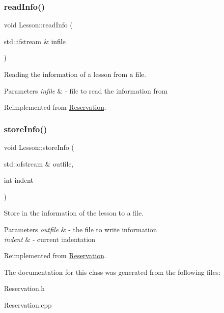 \mbox{\label{class_lesson_a3ac64e2f79bc9e381634d5d30499e8f1}} 
\subsubsection{\texorpdfstring{read\+Info()}{readInfo()}}
{\footnotesize\ttfamily void Lesson\+::read\+Info (\begin{DoxyParamCaption}\item[{std\+::ifstream \&}]{infile }\end{DoxyParamCaption})\hspace{0.3cm}{\ttfamily [virtual]}}



Reading the information of a lesson from a file. 


\begin{DoxyParams}{Parameters}
{\em infile} & -\/ file to read the information from \\
\hline
\end{DoxyParams}


Reimplemented from \mbox{\hyperlink{class_reservation_acff32024a350c2156af9f74522c59b7b}{Reservation}}.

\mbox{\label{class_lesson_a645855060ab3c915a6e0875bc5584887}} 
\subsubsection{\texorpdfstring{store\+Info()}{storeInfo()}}
{\footnotesize\ttfamily void Lesson\+::store\+Info (\begin{DoxyParamCaption}\item[{std\+::ofstream \&}]{outfile,  }\item[{int}]{indent }\end{DoxyParamCaption})\hspace{0.3cm}{\ttfamily [virtual]}}



Store in the information of the lesson to a file. 


\begin{DoxyParams}{Parameters}
{\em outfile} & -\/ the file to write information \\
\hline
{\em indent} & -\/ current indentation \\
\hline
\end{DoxyParams}


Reimplemented from \mbox{\hyperlink{class_reservation_a8ec83fe2eb15294c3a51a9998ed17df7}{Reservation}}.



The documentation for this class was generated from the following files\+:\begin{DoxyCompactItemize}
\item 
Reservation.\+h\item 
Reservation.\+cpp\end{DoxyCompactItemize}
